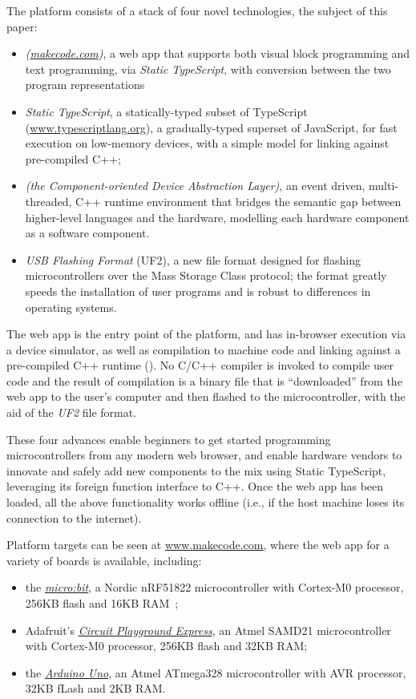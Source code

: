 The platform consists of a stack of four novel technologies, the subject of
this paper:
\begin{itemize}
\item \emph{\MC (\href{https://makecode.com}{makecode.com})}, a web app that supports both visual block programming and text programming,
via \emph{Static TypeScript}, with conversion between the two program representations

\item \emph{Static TypeScript}, a statically-typed subset of TypeScript (\url{www.typescriptlang.org}),
a gradually-typed superset of JavaScript, for fast execution on low-memory devices, with
a simple model for linking against pre-compiled C++;

\item \emph{\CO (the Component-oriented Device Abstraction Layer)}, an event driven, multi-threaded, C++ runtime environment that bridges the semantic gap between higher-level languages and the hardware,
modelling each hardware component as a software component.

\item \emph{USB Flashing Format} (UF2), a new file format designed for flashing microcontrollers over the Mass Storage
Class protocol; the format greatly speeds the installation of user
programs and is robust to differences in operating systems.
\end{itemize}
The \MC web app is the entry point of the platform, and has in-browser execution via a device simulator, as well as compilation to machine code and linking against a
pre-compiled C++ runtime (\emph{\CON}). No C/C++ compiler is invoked to compile user code and the result of compilation is a binary file that is ``downloaded'' from the web app to the user's
computer and then flashed to the microcontroller, with the aid of the \emph{UF2} file format.

These four advances enable beginners to get started programming microcontrollers from any modern web browser, and enable
hardware vendors to innovate and safely add new components to the mix using Static TypeScript, leveraging its
foreign function interface to C++.
Once the web app has been loaded, all the above functionality works offline (i.e., if the host machine loses its connection
to the internet).

Platform targets can be seen at \url{www.makecode.com}, where the \MC web app for a variety of boards is available,
including:
\begin{itemize}
\item the \emph{\href{https://microbit.org}{micro:bit}}, a Nordic nRF51822 microcontroller with Cortex-M0 processor, 256KB flash and 16KB RAM~\cite{microbitICSE2016};
\item Adafruit's \emph{\href{https:/adafruit.com/products/3333}{Circuit Playground Express}}, an Atmel SAMD21 microcontroller with Cortex-M0 processor, 256KB flash and 32KB RAM;
\item the \emph{\href{https://store.arduino.cc/usa/arduino-uno-rev3}{Arduino Uno}}, an Atmel ATmega328 microcontroller with AVR processor, 32KB fLash and 2KB RAM.
\end{itemize}

